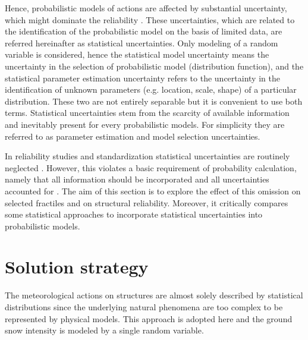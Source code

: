 Hence, probabilistic models of actions are affected by substantial uncertainty, which might dominate the reliability \citep{Coles2003catastrophes}. These uncertainties, which are related to the identification of the probabilistic model on the basis of limited data, are referred hereinafter as statistical uncertainties. Only modeling of a random variable is considered, hence the statistical model uncertainty means the uncertainty in the selection of probabilistic model (distribution function), and the statistical parameter estimation uncertainty refers to the uncertainty in the identification of unknown parameters (e.g. location, scale, shape) of a particular distribution. These two are not entirely separable but it is convenient to use both terms. Statistical uncertainties stem from the scarcity of available information and inevitably present for every probabilistic models. For simplicity they are referred to as parameter estimation and model selection uncertainties.

In reliability studies and standardization statistical uncertainties are routinely neglected \citep{Sanpaolesi1998, Coles2003fully_prob, Sisson2006}. However, this violates a basic requirement of probability calculation, namely that all information should be incorporated and all uncertainties accounted for \citep{Kiureghian1989}. The aim of this section is to explore the effect of this omission on selected fractiles and on structural reliability. Moreover, it critically compares some statistical approaches to incorporate statistical uncertainties into probabilistic models.



\section{Solution strategy}
The meteorological actions on structures are almost solely described by statistical distributions since the underlying natural phenomena are too complex to be represented by physical models. This approach is adopted here and the ground snow intensity is modeled by a single random variable.
  
